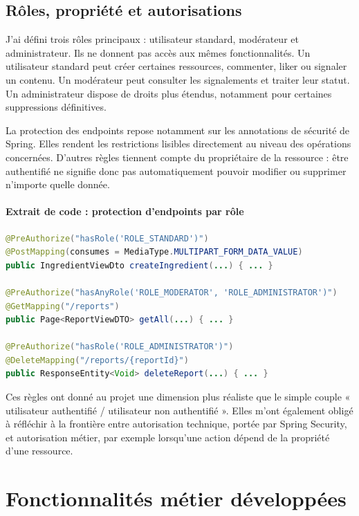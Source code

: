 \subsection{Rôles, propriété et autorisations}

J'ai défini trois rôles principaux : utilisateur standard, modérateur et administrateur. Ils ne donnent pas accès aux mêmes fonctionnalités. Un utilisateur standard peut créer certaines ressources, commenter, liker ou signaler un contenu. Un modérateur peut consulter les signalements et traiter leur statut. Un administrateur dispose de droits plus étendus, notamment pour certaines suppressions définitives.

La protection des endpoints repose notamment sur les annotations de sécurité de Spring. Elles rendent les restrictions lisibles directement au niveau des opérations concernées. D'autres règles tiennent compte du propriétaire de la ressource : être authentifié ne signifie donc pas automatiquement pouvoir modifier ou supprimer n'importe quelle donnée.

\paragraph{Extrait de code : protection d'endpoints par rôle}

\begin{lstlisting}[language=Java,caption={Exemples de restrictions d'accès par rôle},label={lst:feastverse-preauthorize}]
@PreAuthorize("hasRole('ROLE_STANDARD')")
@PostMapping(consumes = MediaType.MULTIPART_FORM_DATA_VALUE)
public IngredientViewDto createIngredient(...) { ... }

@PreAuthorize("hasAnyRole('ROLE_MODERATOR', 'ROLE_ADMINISTRATOR')")
@GetMapping("/reports")
public Page<ReportViewDTO> getAll(...) { ... }

@PreAuthorize("hasRole('ROLE_ADMINISTRATOR')")
@DeleteMapping("/reports/{reportId}")
public ResponseEntity<Void> deleteReport(...) { ... }
\end{lstlisting}

Ces règles ont donné au projet une dimension plus réaliste que le simple couple « utilisateur authentifié / utilisateur non authentifié ». Elles m'ont également obligé à réfléchir à la frontière entre autorisation technique, portée par Spring Security, et autorisation métier, par exemple lorsqu'une action dépend de la propriété d'une ressource.

\section{Fonctionnalités métier développées}

